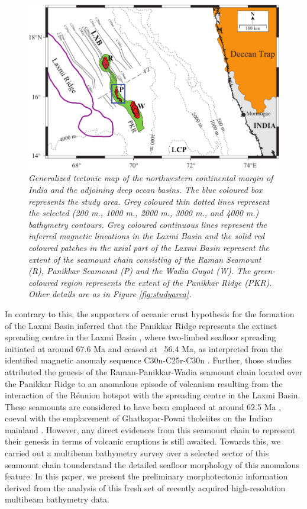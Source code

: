 \documentclass[twocolumn]{article}
\begin{document}
\begin{figure}[!htb]
	\centering
	\includegraphics[width=0.8\linewidth]{tectonic-framework.pdf}
	\caption{
		\textsl{	Generalized tectonic map of the northwestern continental margin of India and the adjoining deep ocean basins. The blue coloured box represents the study area. Grey coloured thin dotted lines represent the selected (200 m., 1000 m., 2000 m., 3000 m., and 4000 m.) bathymetry contours. Grey coloured continuous lines represent the inferred magnetic lineations in the Laxmi Basin  \citep{Bhattacharya2015} and the solid red coloured patches in the axial part of the Laxmi Basin represent the extent of the seamount chain \citep{Bhattacharya1994b} consisting of the Raman Seamount (R), Panikkar Seamount (P) and the Wadia Guyot (W). The green-coloured region represents the extent of the Panikkar Ridge (PKR).  Other details are as in Figure \ref{fig:studyarea}.}
	}
	\label{fig:studyarea2}
\end{figure}
In contrary to this, the supporters of oceanic crust hypothesis for the formation of the Laxmi Basin inferred that the Panikkar Ridge represents the extinct spreading centre in the Laxmi Basin \citep{Bhattacharya1994a,Bhattacharya1994b}, where two-limbed seafloor spreading initiated at around 67.6 Ma and ceased at ~56.4 Ma, as interpreted from the identified magnetic anomaly sequence C30n-C25r-C30n \citep{Bhattacharya2015,Yatheesh2020}. Further, those studies attributed the genesis of the Raman-Panikkar-Wadia seamount chain located over the Panikkar Ridge to an anomalous episode of volcanism resulting from the interaction of the R\'eunion hotspot with the spreading centre in the Laxmi Basin. These seamounts are considered to have been emplaced at around 62.5 Ma \citep{Bhattacharya2015,Yatheesh2020}, coeval with the emplacement of Ghatkopar-Powai tholeiites on the Indian mainland \citep{Pande2017}. However, any direct evidences from this seamount chain to represent their genesis in terms of volcanic eruptions is still awaited. Towards this, we carried out a multibeam bathymetry survey over a selected sector of this seamount chain tounderstand the detailed seafloor morphology of this anomalous feature. In this paper, we present the preliminary morphotectonic information derived from the analysis of this fresh set of recently acquired high-resolution multibeam bathymetry data.
\end{document}
